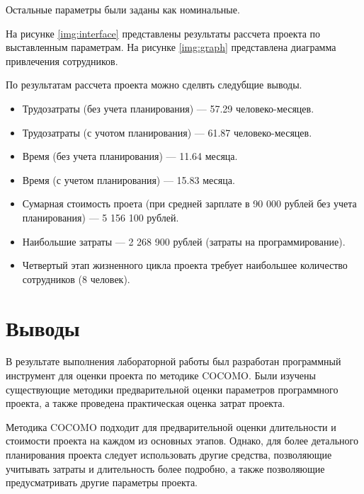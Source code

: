 \documentclass{bmstu}
\begin{document}
Остальные параметры были заданы как номинальные.

На рисунке \ref{img:interface} представлены результаты рассчета проекта по выставленным параметрам.
На рисунке \ref{img:graph} представлена диаграмма привлечения сотрудников.

\clearpage



\clearpage

По результатам рассчета проекта можно сделвть следубщие выводы.

\begin{itemize}
    \item Трудозатраты (без учета планирования) --- 57.29 человеко-месяцев.
    \item Трудозатраты (с учотом планирования) --- 61.87 человеко-месяцев.
    \item Время (без учета планирования) --- 11.64 месяца.
    \item Время (с учетом планирования) --- 15.83 месяца.
    \item Сумарная стоимость проета (при средней зарплате в 90 000 рублей без учета планирования) --- 5 156 100 рублей.
    \item Наибольшие затраты --- 2 268 900 рублей (затраты на программирование).
    \item Четвертый этап жизненного цикла проекта требует наибольшее количество сотрудников (8 человек).
\end{itemize}

\section*{Выводы}

В результате выполнения лабораторной работы был разработан программный инструмент для оценки проекта по методике COCOMO. Были изучены существующие методики предварительной оценки параметров программного проекта, а также проведена практическая оценка затрат проекта.

Методика COCOMO подходит для предварительной оценки длительности и стоимости проекта на каждом из основных этапов. Однако, для более детального планирования проекта следует использовать другие средства, позволяющие учитывать затраты и длительность более подробно, а также позволяющие предусматривать другие параметры проекта.
\end{document}
